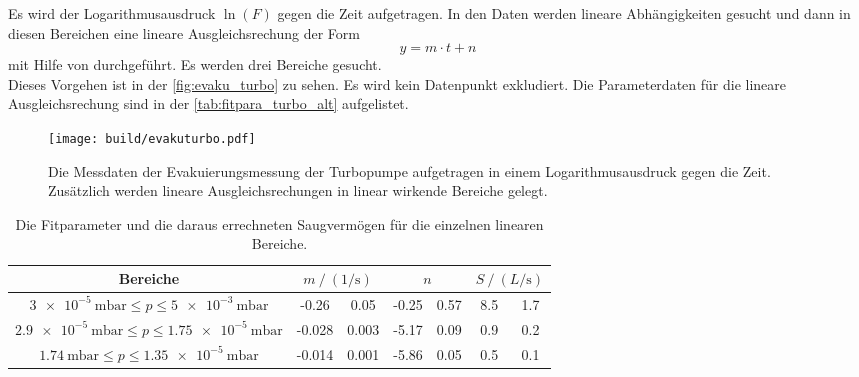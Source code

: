     \noindent Es wird der Logarithmusausdruck $\ln(F)$ gegen die Zeit aufgetragen. In den Daten werden lineare Abhängigkeiten gesucht und dann in diesen Bereichen
    eine lineare Ausgleichsrechung der Form 
    \begin{equation*}
      y = m \cdot t + n
    \end{equation*}
    mit Hilfe von \cite{scipy} durchgeführt. Es werden drei Bereiche gesucht. \\
    Dieses Vorgehen ist in der \autoref{fig:evaku_turbo} zu sehen.
    Es wird kein Datenpunkt exkludiert. 
    Die Parameterdaten für die lineare Ausgleichsrechung sind in der \autoref{tab:fitpara_turbo_alt} aufgelistet. \\ 
    

    \begin{figure}[h]
      \centering
      \texttt{[image: build/evakuturbo.pdf]}
      \caption{Die Messdaten der Evakuierungsmessung der Turbopumpe aufgetragen in einem Logarithmusausdruck gegen die Zeit. Zusätzlich werden lineare Ausgleichsrechungen in linear wirkende Bereiche gelegt.}
      \label{fig:evaku_turbo}
    \end{figure}

    \begin{table}[h]
      \centering
      \caption{Die Fitparameter und die daraus errechneten Saugvermögen für die einzelnen linearen Bereiche.}
      \label{tab:fitpara_turbo_alt}
      \begin{tabular}{c S[table-format=2.3] @{${}\pm{}$} S[table-format=2.3] S @{${}\pm{}$} S[table-format=1.2] S[table-format=1.1] @{${}\pm{}$} S[table-format=1.1]}
        \toprule
        {Bereiche} &  &  & \\
        \midrule
        $\SI{3e-5}{\milli\bar} \leq p \leq \SI{5e-3}{\milli\bar}$   & -0.26  & 0.05  & -0.25 & 0.57 & 8.5 & 1.7 \\
        $\SI{2.9e-5}{\milli\bar} \leq p \leq \SI{1.75e-5}{\milli\bar}$ & -0.028 & 0.003 & -5.17 & 0.09 & 0.9 & 0.2 \\
        $\SI{1.74}{\milli\bar} \leq p \leq \SI{1.35e-5}{\milli\bar}$ & -0.014 & 0.001 & -5.86 & 0.05 & 0.5 & 0.1 \\
        \bottomrule
      \end{tabular}
    \end{table}


